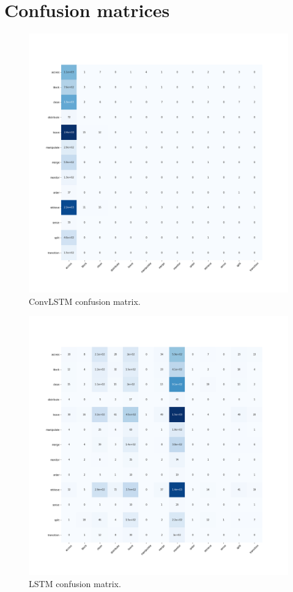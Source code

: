 \documentclass[12pt, a4paper]{report}
\begin{document}
	\chapter{Confusion matrices}\label{appendix_e}
		\begin{figure}[h!]
			\centering
			\includegraphics[width=1.\textwidth]{cfs_mtrx/epic55_ConvLSTM_0_last.tf.npz_0.png}
			\caption{ConvLSTM confusion matrix.}
			\label{cfs_mtrx_convlstm}
		\end{figure}
		\begin{figure}[h!]
			\centering
			\includegraphics[width=1.\textwidth]{cfs_mtrx/epic55LSTM1_50.tf.npz_0.png}
			\caption{LSTM confusion matrix.}
			\label{cfs_mtrx_lstm}
		\end{figure}
	\makeutbmbackcover{}
\end{document}
